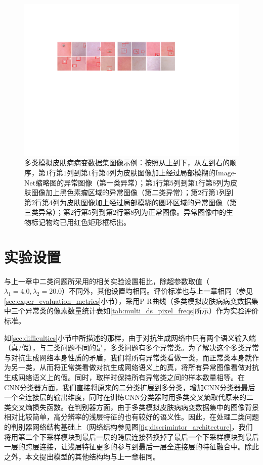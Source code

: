 \begin{figure}[h]
	\centering
	\includegraphics[width=1.0\textwidth]{figure/multi_classes_simulated_skin.pdf}
	\caption{多类模拟皮肤病病变数据集图像示例：按照从上到下，从左到右的顺序，第$1$行第$1$列到第$1$行第$4$列为皮肤图像加上经过局部模糊的Image-Net缩略图的异常图像（第一类异常）；第$1$行第$5$列到第$1$行第$8$列为皮肤图像加上黑色素瘤区域的异常图像（第二类异常）；第$2$行第$1$列到第$2$行第$4$列为皮肤图像加上经过局部模糊的圆环区域的异常图像（第三类异常）；第$2$行第$5$列到第$2$行第$8$列为正常图像。异常图像中的生物标记物均已用红色矩形框标出。}
	\label{fig:mul_classes_simulated_ds}
\end{figure}

\section{实验设置}\label{sec:multi_classes_experiment_setting}
与上一章中二类问题所采用的相关实验设置相比，除超参数取值（$\lambda_{1}=4.0,\lambda_{2}=20.0$）不同外，其他设置均相同。评价标准也与上一章相同（参见\ref{sec:exper_evaluation_metrics}小节），采用P-R曲线（多类模拟皮肤病病变数据集中三个异常类的像素数量统计表如\ref{tab:multi_ds_pixel_freqs}所示）作为实验评价标准。

如\ref{sec:difficulties}小节中所描述的那样，由于对抗生成网络中只有两个语义输入端（真/假），与二类问题不同的是，多类问题有多个异常类。为了解决这个多类异常与对抗生成网络本身性质的矛盾，我们将所有异常类看做一类，而正常类本身就作为另一类，从而将正常类看做对抗生成网络语义上的真，将所有异常图像看做对抗生成网络语义上的假。同时，取样时保持所有异常类之间的样本数量相等。在CNN分类器方面，我们直接将原来的二分类扩展到多分类，增加CNN分类器最后一个全连接层的输出维度，同时在训练CNN分类器时用多类交叉熵取代原来的二类交叉熵损失函数。在判别器方面，由于多类模拟皮肤病病变数据集中的图像背景相对比较简单，高分辨率的浅层特征的也有较好的语义性。因此，在处理二类问题的判别器网络结构基础上（网络结构参见图\ref{fig:discrimintor_architecture}，我们将用第二个下采样模块到最后一层的跨层连接替换掉了最后一个下采样模块到最后一层的跨层连接，让浅层特征更多的参与到最后一层全连接层的特征融合中。除此之外，本文提出模型的其他结构均与上一章相同。

